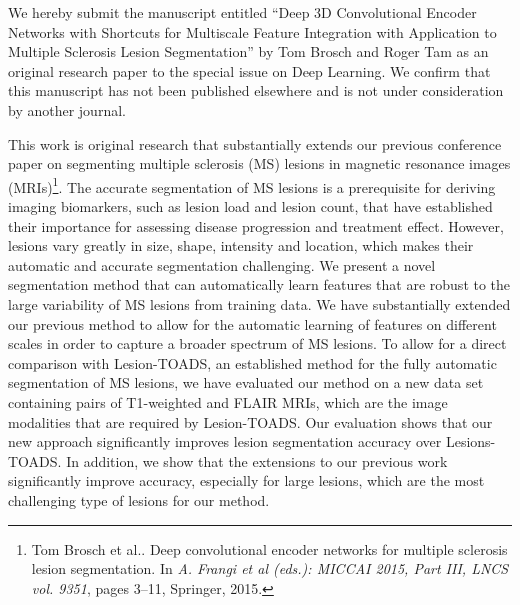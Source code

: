 \documentclass[10pt,stdletter,dateleft,sigleft,orderfromtodate]{newlfm} %
\begin{document}
\begin{newlfm}

 
We hereby submit the manuscript entitled ``Deep 3D Convolutional Encoder
Networks with Shortcuts for Multiscale Feature Integration with Application to
Multiple Sclerosis Lesion Segmentation'' by Tom Brosch and Roger Tam as an
original research paper to the special issue on Deep Learning. We confirm that
this manuscript has not been published elsewhere and is not under consideration
by another journal.

This work is original research that substantially extends our previous
conference paper on segmenting multiple sclerosis (MS) lesions in magnetic
resonance images (MRIs)\footnote{Tom Brosch et al.. Deep convolutional encoder
networks for multiple sclerosis lesion segmentation. In \emph{A. Frangi et al
(eds.): MICCAI 2015, Part III, LNCS vol. 9351}, pages 3--11, Springer, 2015.}.
The accurate segmentation of MS lesions is a prerequisite for deriving imaging
biomarkers, such as lesion load and lesion count, that have established their
importance for assessing disease progression and treatment effect. However,
lesions vary greatly in size, shape, intensity and location, which makes their
automatic and accurate segmentation challenging. We present a novel segmentation
method that can automatically learn features that are robust to the large
variability of MS lesions from training data. We have substantially extended our
previous method to allow for the automatic learning of features on different
scales in order to capture a broader spectrum of MS lesions. To allow for a
direct comparison with Lesion-TOADS, an established method for the fully
automatic segmentation of MS lesions, we have evaluated our method on a new data
set containing pairs of T1-weighted and FLAIR MRIs, which are the image
modalities that are required by Lesion-TOADS. Our evaluation shows that our new
approach significantly improves lesion segmentation accuracy over Lesions-TOADS.
In addition, we show that the extensions to our previous work significantly
improve accuracy, especially for large lesions, which are the most challenging
type of lesions for our method.


\end{newlfm}
\end{document}
